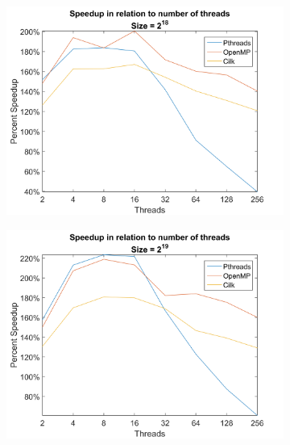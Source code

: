 \documentclass[11pt,a4paper,titlepage]{article}
\begin{document}
\begin{figure}[h!]
\begin{subfigure}[b]{0.45\textwidth}
				\includegraphics[width=\textwidth]{figures/figure-3.3.png}
				\caption{}
			\end{subfigure}
			\begin{subfigure}[b]{0.45\textwidth}
				\includegraphics[width=\textwidth]{figures/figure-3.4.png}
				\caption{}
			\end{subfigure}			
		\end{figure}  
\end{document}
